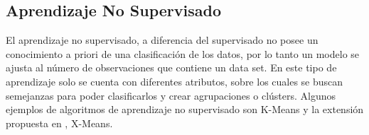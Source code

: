 \subsection{Aprendizaje No Supervisado}

El aprendizaje no supervisado, a diferencia del supervisado no posee un conocimiento a priori de una clasificación de los datos, por lo tanto un modelo se ajusta al número de observaciones que contiene un data set. En este tipo de aprendizaje solo se cuenta con diferentes atributos, sobre los cuales se buscan semejanzas para poder clasificarlos y crear agrupaciones o clústers. Algunos ejemplos de algoritmos de aprendizaje no supervisado son K-Means y la extensión propuesta en \cite{Pelleg00x-means:extending}, X-Means.